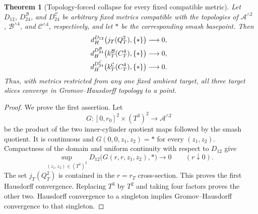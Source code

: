 \documentclass[11pt,letterpaper]{article}
\numberwithin{equation}{section}
\newtheorem{theorem}{Theorem}[section]
\theoremstyle{definition}
\theoremstyle{remark}
\begin{document}
\begin{theorem}[Topology-forced collapse for every fixed compatible metric]
\label{thm:uniform-collapse}
Let \(D_{12}\), \(D_{24}^{\mathcal B}\), and
\(D_{24}^{\mathcal C}\) be arbitrary fixed metrics compatible with the
topologies of \(\mathcal A^{\wedge2}\),
\(\mathcal B^{\wedge4}\), and \(\mathcal C^{\wedge4}\), respectively,
and let \(*\) be the corresponding smash basepoint.  Then
\begin{align}
 d_H^{D_{12}}\bigl(j_T(Q_T^2),\{*\}\bigr)&\longrightarrow0,\notag\\
 d_H^{D_{24}^{\mathcal B}}
  \bigl(k_T^{\mathcal B}(C_T^4),\{*\}\bigr)&\longrightarrow0,\notag\\
 d_H^{D_{24}^{\mathcal C}}
  \bigl(k_T^{\mathcal C}(C_T^4),\{*\}\bigr)&\longrightarrow0.
 \label{eq:fixed-metric-collapse}
\end{align}
Thus, with metrics restricted from any one fixed ambient target, all
three target slices converge in Gromov--Hausdorff topology to a point.
\end{theorem}

\begin{proof}
We prove the first assertion.  Let
\[
 G:[0,r_0]^2\times(T^3)^2\longrightarrow\mathcal A^{\wedge2}
\]
be the product of the two inner-cylinder quotient maps followed by the
smash quotient.  It is continuous and
\(G(0,0,z_1,z_2)=*\) for every \((z_1,z_2)\).  Compactness of the domain
and uniform continuity with respect to \(D_{12}\) give
\[
 \sup_{(z_1,z_2)\in(T^3)^2}
 D_{12}\bigl(G(r,r,z_1,z_2),*\bigr)\longrightarrow0
 \qquad(r\downarrow0).
\]
The set \(j_T(Q_T^2)\) is contained in the \(r=r_T\)
cross-section.  This proves the first Hausdorff convergence.  Replacing
\(T^3\) by \(T^2\) and taking four factors proves the other two.
Hausdorff convergence to a singleton implies Gromov--Hausdorff
convergence to that singleton.
\end{proof}
\end{document}
